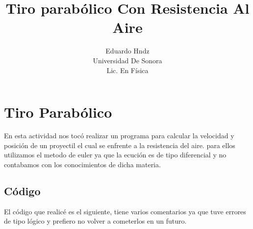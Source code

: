 \documentclass{article}
\title{Tiro parabólico Con Resistencia Al Aire}
\author{Eduardo Hndz\\Universidad De Sonora\\Lic. En Física}
\begin{document}
\maketitle

\section {Tiro Parabólico}
En esta actividad nos tocó realizar un programa para calcular la velocidad y posición de un proyectil el cual se enfrente a la resistencia del aire.
para ellos utilizamos el metodo de euler ya que la ecución es de tipo diferencial y no contabamos con los conocimientos de dicha materia.
\subsection {Código}
El código que realicé es el siguiente, tiene varios comentarios ya que tuve errores de tipo lógico y prefiero no volver a cometerlos en un futuro.
\end{document}
